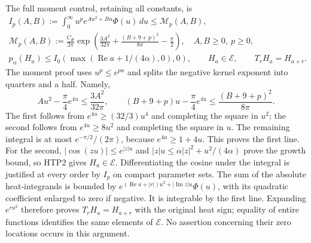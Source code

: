 The full moment control, retaining all constants, is
\begin{equation}\tag{HTP20}
\begin{gathered}
 I_p(A,B):=\int_0^\infty u^pe^{Au^2+Bu}\Phi(u)\,du
 \le\mathcal M_p(A,B),\\
 \mathcal M_p(A,B):=
 \frac{C_\Phi}{2\pi}
 \exp\left(\frac{3A^2}{32\pi}
       +\frac{(B+9+p)^2}{8\pi}-\frac\pi2\right),
 \quad A,B\ge0,\ p\ge0,\\
 p_\alpha(H_a)\le I_0(\max(\operatorname{Re}a+1/(4\alpha),0),0),
 \qquad H_a\in\mathcal E,\qquad T_rH_a=H_{a+r}.
\end{gathered}
\end{equation}
The moment proof uses $u^p\le e^{pu}$ and splits the
negative kernel exponent into quarters and a half. Namely,
\[
 Au^2-\frac\pi4e^{4u}\le\frac{3A^2}{32\pi},\qquad
 (B+9+p)u-\frac\pi4e^{4u}\le\frac{(B+9+p)^2}{8\pi}.
\]
The first follows from $e^{4u}\ge(32/3)u^4$ and completing
the square in $u^2$; the second follows from $e^{4u}\ge8u^2$
and completing the square in $u$.
The remaining integral is at most $e^{-\pi/2}/(2\pi)$,
because $e^{4u}\ge1+4u$. This proves the first line.
For the second, $|\cos(zu)|\le e^{|z|u}$ and
$|z|u\le\alpha|z|^2+u^2/(4\alpha)$ prove the growth bound,
so HTP2 gives $H_a\in\mathcal E$.
Differentiating the cosine under the integral is justified
at every order by $I_p$ on compact parameter sets. The sum
of the absolute heat-integrands is bounded by
$e^{(\operatorname{Re}a+|r|)u^2+|\operatorname{Im}z|u}\Phi(u)$,
with its quadratic coefficient enlarged to zero if negative.
It is integrable by the first line. Expanding $e^{ru^2}$
therefore proves $T_rH_a=H_{a+r}$ with the original heat
sign; equality of entire functions identifies the same
elements of $\mathcal E$. No assertion concerning their
zero locations occurs in this argument.

